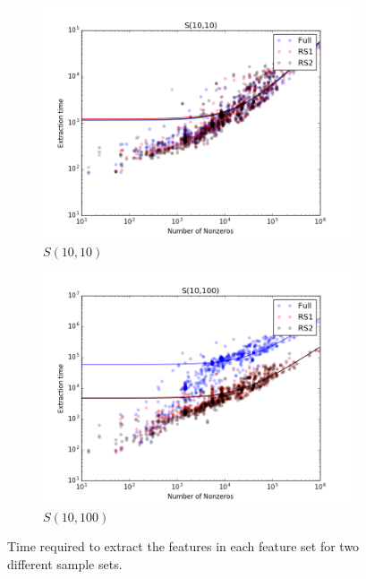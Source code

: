 \begin{figure}[h]
    \centering
    \begin{subfigure}{0.475\textwidth}
     \centering 
     \includegraphics[width=\textwidth]{figures/figure7.png}
     \caption{ $S(10,10)$ }
     \label{4accuracy0}
     \end{subfigure}
     \hfill
    \begin{subfigure}{0.475\textwidth}
     \centering 
     \includegraphics[width=\textwidth]{figures/figure8.png}
     \caption{$S(10,100)$}
     \label{4accuracy1}
     \end{subfigure}
     \caption{Time required to extract the features in each feature set for two different sample sets.}
\end{figure}


